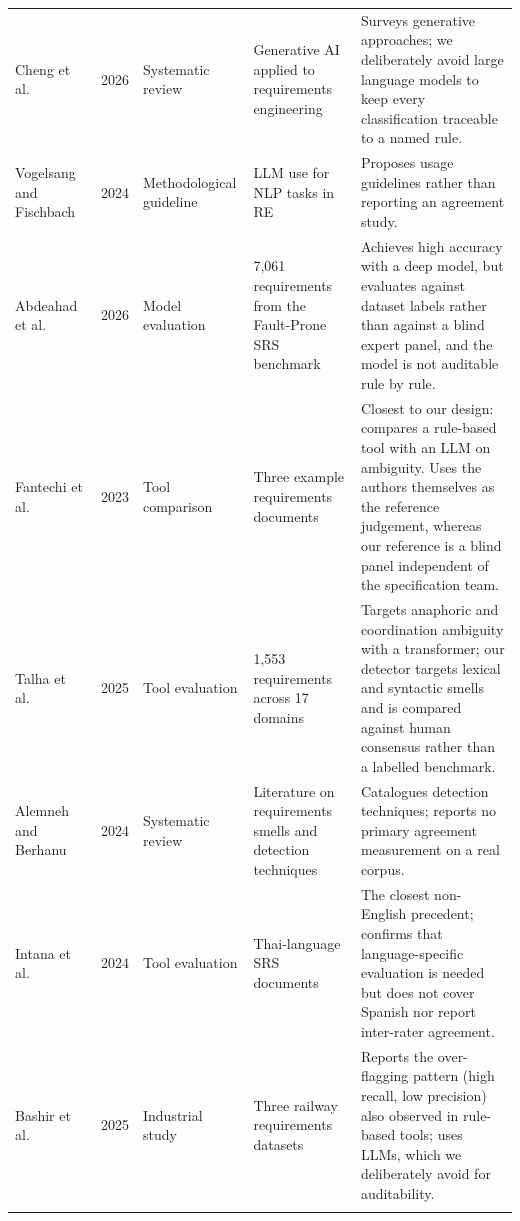 \documentclass[pdflatex,sn-mathphys-num]{sn-jnl}
\theoremstyle{thmstyleone}%
\theoremstyle{thmstyletwo}%
\theoremstyle{thmstylethree}%
\begin{document}
\begin{table}[h]
\begin{tabular}{@{}p{2.1cm}p{0.7cm}p{2.2cm}p{2.4cm}p{4.0cm}@{}}
			Cheng et al.~\cite{cheng2026} & 2026 & Systematic review & Generative AI applied
			to requirements engineering & Surveys generative approaches; we deliberately
			avoid large language models to keep every classification traceable to a named
			rule. \\
			Vogelsang and Fischbach~\cite{vogelsang2024} & 2024 & Methodological guideline &
			LLM use for NLP tasks in RE & Proposes usage guidelines rather than reporting an
			agreement study. \\
			Abdeahad et al.~\cite{abdeahad2026} & 2026 & Model evaluation &
			7,061 requirements from the Fault-Prone SRS benchmark & Achieves high accuracy
			with a deep model, but evaluates against dataset labels rather than against a
			blind expert panel, and the model is not auditable rule by rule. \\
			Fantechi et al.~\cite{fantechi2023} & 2023 & Tool comparison & Three example
			requirements documents & Closest to our design: compares a rule-based tool with
			an LLM on ambiguity. Uses the authors themselves as the reference judgement,
			whereas our reference is a blind panel independent of the specification team. \\
			Talha et al.~\cite{talha2025} & 2025 & Tool evaluation & 1,553 requirements
			across 17 domains & Targets anaphoric and coordination ambiguity with a
			transformer; our detector targets lexical and syntactic smells and is compared
			against human consensus rather than a labelled benchmark. \\
			Alemneh and Berhanu~\cite{alemneh2024} & 2024 & Systematic review & Literature
			on requirements smells and detection techniques & Catalogues detection
			techniques; reports no primary agreement measurement on a real corpus. \\
			Intana et al.~\cite{intana2024} & 2024 & Tool evaluation & Thai-language SRS
			documents & The closest non-English precedent; confirms that language-specific
			evaluation is needed but does not cover Spanish nor report inter-rater
			agreement. \\
			Bashir et al.~\cite{bashir2025} & 2025 & Industrial study & Three railway
			requirements datasets & Reports the over-flagging pattern (high recall, low
			precision) also observed in rule-based tools; uses LLMs, which we deliberately
			avoid for auditability. \\
			\botrule
		\end{tabular}
	\end{table}
	
\end{document}
